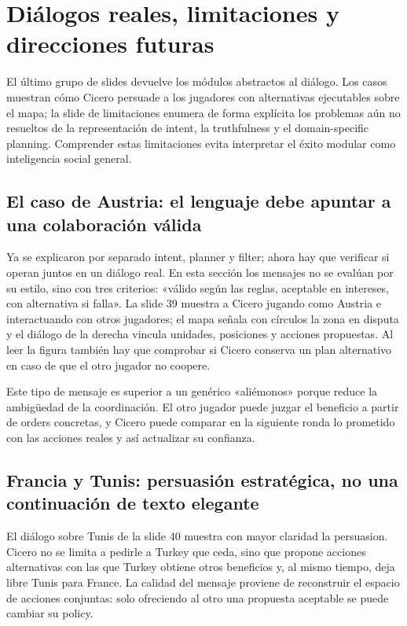 \section{Diálogos reales, limitaciones y direcciones futuras}

El último grupo de slides devuelve los módulos abstractos al diálogo. Los casos muestran cómo Cicero persuade a los jugadores con alternativas ejecutables sobre el mapa; la slide de limitaciones enumera de forma explícita los problemas aún no resueltos de la representación de intent, la truthfulness y el domain-specific planning. Comprender estas limitaciones evita interpretar el éxito modular como inteligencia social general.

\subsection{El caso de Austria: el lenguaje debe apuntar a una colaboración válida}

Ya se explicaron por separado intent, planner y filter; ahora hay que verificar si operan juntos en un diálogo real. En esta sección los mensajes no se evalúan por su estilo, sino con tres criterios: «válido según las reglas, aceptable en intereses, con alternativa si falla». La slide 39 muestra a Cicero jugando como Austria e interactuando con otros jugadores; el mapa señala con círculos la zona en disputa y el diálogo de la derecha vincula unidades, posiciones y acciones propuestas. Al leer la figura también hay que comprobar si Cicero conserva un plan alternativo en caso de que el otro jugador no coopere.


Este tipo de mensaje es superior a un genérico «aliémonos» porque reduce la ambigüedad de la coordinación. El otro jugador puede juzgar el beneficio a partir de orders concretas, y Cicero puede comparar en la siguiente ronda lo prometido con las acciones reales y así actualizar su confianza.

\subsection{Francia y Tunis: persuasión estratégica, no una continuación de texto elegante}

El diálogo sobre Tunis de la slide 40 muestra con mayor claridad la persuasion. Cicero no se limita a pedirle a Turkey que ceda, sino que propone acciones alternativas con las que Turkey obtiene otros beneficios y, al mismo tiempo, deja libre Tunis para France. La calidad del mensaje proviene de reconstruir el espacio de acciones conjuntas: solo ofreciendo al otro una propuesta aceptable se puede cambiar su policy.

